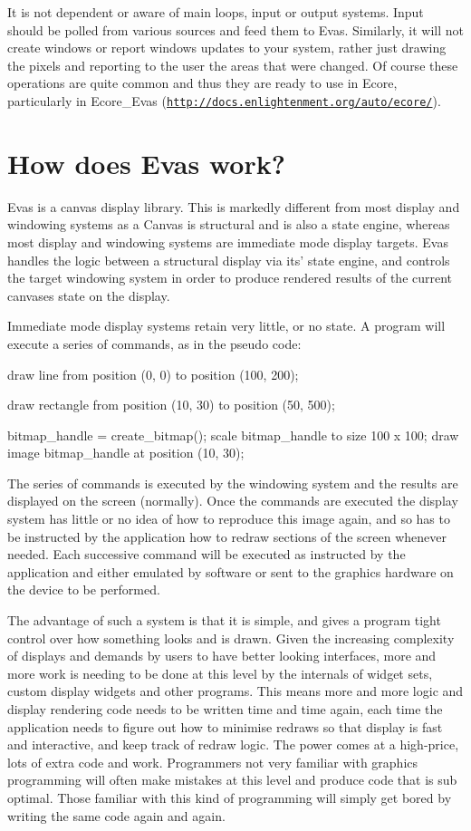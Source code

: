 It is not dependent or aware of main loops, input or output systems. Input should be polled from various sources and feed them to Evas. Similarly, it will not create windows or report windows updates to your system, rather just drawing the pixels and reporting to the user the areas that were changed. Of course these operations are quite common and thus they are ready to use in Ecore, particularly in Ecore\_\-Evas (\href{http://docs.enlightenment.org/auto/ecore/}{\tt http://docs.enlightenment.org/auto/ecore/}).\hypertarget{index_work}{}\section{How does Evas work?}\label{index_work}
Evas is a canvas display library. This is markedly different from most display and windowing systems as a Canvas is structural and is also a state engine, whereas most display and windowing systems are immediate mode display targets. Evas handles the logic between a structural display via its' state engine, and controls the target windowing system in order to produce rendered results of the current canvases state on the display.

Immediate mode display systems retain very little, or no state. A program will execute a series of commands, as in the pseudo code:

\begin{DoxyVerb}
draw line from position (0, 0) to position (100, 200);

draw rectangle from position (10, 30) to position (50, 500);

bitmap_handle = create_bitmap();
scale bitmap_handle to size 100 x 100;
draw image bitmap_handle at position (10, 30);
\end{DoxyVerb}


The series of commands is executed by the windowing system and the results are displayed on the screen (normally). Once the commands are executed the display system has little or no idea of how to reproduce this image again, and so has to be instructed by the application how to redraw sections of the screen whenever needed. Each successive command will be executed as instructed by the application and either emulated by software or sent to the graphics hardware on the device to be performed.

The advantage of such a system is that it is simple, and gives a program tight control over how something looks and is drawn. Given the increasing complexity of displays and demands by users to have better looking interfaces, more and more work is needing to be done at this level by the internals of widget sets, custom display widgets and other programs. This means more and more logic and display rendering code needs to be written time and time again, each time the application needs to figure out how to minimise redraws so that display is fast and interactive, and keep track of redraw logic. The power comes at a high-\/price, lots of extra code and work. Programmers not very familiar with graphics programming will often make mistakes at this level and produce code that is sub optimal. Those familiar with this kind of programming will simply get bored by writing the same code again and again.

